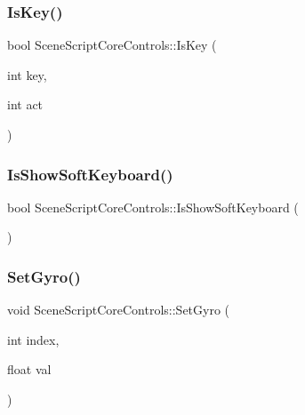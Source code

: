 \hypertarget{class_scene_script_core_controls_a03de5ad8036778c2612b28f0ba64a294}{}\label{class_scene_script_core_controls_a03de5ad8036778c2612b28f0ba64a294} 
\subsubsection{\texorpdfstring{Is\+Key()}{IsKey()}}
{\footnotesize\ttfamily bool Scene\+Script\+Core\+Controls\+::\+Is\+Key (\begin{DoxyParamCaption}\item[{int}]{key,  }\item[{int}]{act }\end{DoxyParamCaption})}

\hypertarget{class_scene_script_core_controls_aee0343f695b42210bb91dcb81ac65b05}{}\label{class_scene_script_core_controls_aee0343f695b42210bb91dcb81ac65b05} 
\subsubsection{\texorpdfstring{Is\+Show\+Soft\+Keyboard()}{IsShowSoftKeyboard()}}
{\footnotesize\ttfamily bool Scene\+Script\+Core\+Controls\+::\+Is\+Show\+Soft\+Keyboard (\begin{DoxyParamCaption}{ }\end{DoxyParamCaption})}

\hypertarget{class_scene_script_core_controls_afdd4326d6e6eb62b4306796588ccd559}{}\label{class_scene_script_core_controls_afdd4326d6e6eb62b4306796588ccd559} 
\subsubsection{\texorpdfstring{Set\+Gyro()}{SetGyro()}}
{\footnotesize\ttfamily void Scene\+Script\+Core\+Controls\+::\+Set\+Gyro (\begin{DoxyParamCaption}\item[{int}]{index,  }\item[{float}]{val }\end{DoxyParamCaption})}

